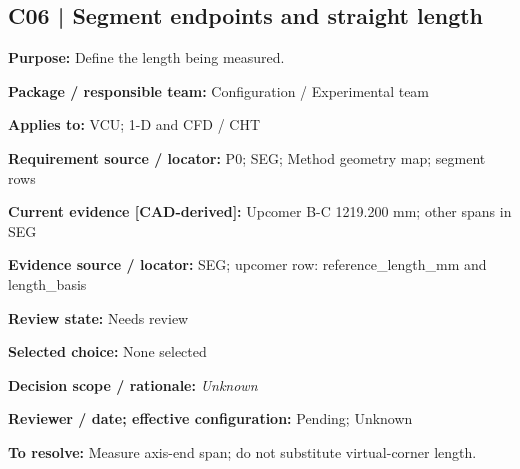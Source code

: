 \documentclass[11pt]{article}
\begin{document}
\par\noindent\begin{minipage}{\textwidth}\small\setlength{\parskip}{2pt}
\subsection*{C06 | Segment endpoints and straight length}
\textbf{Purpose:} Define the length being measured.\par
\textbf{Package / responsible team:} Configuration / Experimental team\par
\textbf{Applies to:} VCU; 1-D and CFD / CHT\par
\textbf{Requirement source / locator:} P0; SEG; Method geometry map; segment rows\par
\textbf{Current evidence [CAD-derived]:} Upcomer B-C 1219.200 mm; other spans in SEG\par
\textbf{Evidence source / locator:} SEG; upcomer row: reference\_\allowbreak{}length\_\allowbreak{}mm and length\_\allowbreak{}basis\par
\textbf{Review state:} Needs review\par
\textbf{Selected choice:} None selected\par
\textbf{Decision scope / rationale:} \textit{Unknown}\par
\textbf{Reviewer / date; effective configuration:} Pending; Unknown\par
\textbf{To resolve:} Measure axis-end span; do not substitute virtual-corner length.\par
\end{minipage}\par\vspace{5pt}
\end{document}
